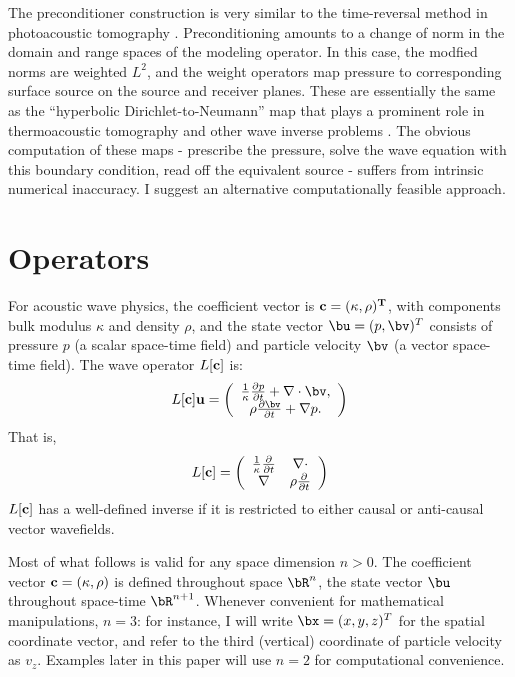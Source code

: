 The preconditioner construction is very similar to the time-reversal
method in photoacoustic tomography
\cite[]{StefanovUhlmannIP:09}. Preconditioning amounts to a change of
norm in the domain and range spaces of the modeling operator. In this
case, the modfied norms are weighted $L^2$, and the weight operators
map pressure to corresponding surface source on the source and
receiver planes. These are essentially the same as the ``hyperbolic
Dirichlet-to-Neumann'' map that plays a prominent role in
thermoacoustic tomography and other wave inverse problems
\cite[]{Rachele:00,StefUhl:05}. The obvious computation of these maps
- prescribe the pressure, solve the wave equation with this boundary
condition, read off the equivalent source - suffers from intrinsic
numerical inaccuracy. I suggest an alternative computationally
feasible approach.

\section{Operators}

For acoustic wave physics, the coefficient vector is
$\bf{c}=(\kappa,\rho)^T$, with components bulk modulus $\kappa$ and
density $\rho$, and the state vector $\bu=(p,\bv)^T$ consists of
pressure $p$ (a scalar space-time field) and particle velocity $\bv$
(a vector space-time field). The wave operator $L[\bf{c}]$ is:
\begin{equation}
\label{eqn:aweop}
L[\bf{c}]\bf{u} = 
\left(
\begin{array}{c}
\frac{1}{\kappa}\frac{\partial p}{\partial t}  + \nabla \cdot \bv, \\
\rho\frac{\partial \bv}{\partial t} + \nabla p.
\end{array}
\right) 
\end{equation}
That is,
\begin{equation}
  \label{eqn:awemat}
  L[{\bf c}] = \left(
    \begin{array}{cc}
      \frac{1}{\kappa}\frac{\partial}{\partial t} & \nabla \cdot \\
      \nabla & \rho \frac{\partial}{\partial t}
    \end{array}
  \right)
\end{equation}
$L[{\bf c}]$ has a well-defined inverse if it is restricted to either
causal or anti-causal vector wavefields.

Most of what follows is valid for any space dimension $n >0$. The
coefficient vector $\bf{c}=(\kappa,\rho)$ is defined throughout space
$\bR^n$, the state vector $\bu$ throughout space-time
$\bR^{n+1}$. Whenever convenient for mathematical manipulations,
$n=3$: for instance, I will write $\bx=(x,y,z)^T$ for the spatial
coordinate vector, and refer to the third (vertical) coordinate of
particle velocity as $v_z$. Examples
later in this paper will use $n=2$ for computational convenience.

